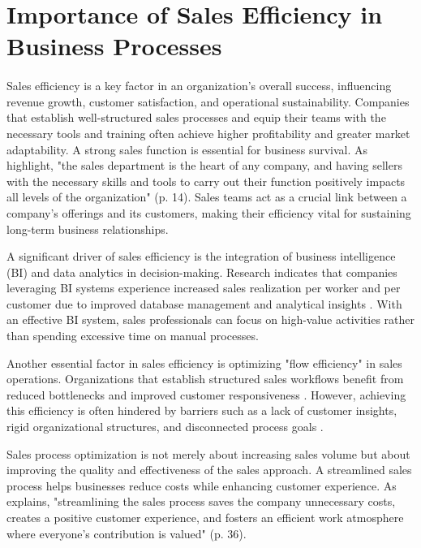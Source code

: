 \section{Importance of Sales Efficiency in Business Processes}

\paragraph{} Sales efficiency is a key factor in an organization's overall success, influencing revenue growth, customer satisfaction, and operational sustainability. Companies that establish well-structured sales processes and equip their teams with the necessary tools and training often achieve higher profitability and greater market adaptability. A strong sales function is essential for business survival. As \cite{deleon2023} highlight, "the sales department is the heart of any company, and having sellers with the necessary skills and tools to carry out their function positively impacts all levels of the organization" (p. 14). Sales teams act as a crucial link between a company's offerings and its customers, making their efficiency vital for sustaining long-term business relationships.

A significant driver of sales efficiency is the integration of business intelligence (BI) and data analytics in decision-making. Research indicates that companies leveraging BI systems experience increased sales realization per worker and per customer due to improved database management and analytical insights \cite{poljak2024}. With an effective BI system, sales professionals can focus on high-value activities rather than spending excessive time on manual processes.

Another essential factor in sales efficiency is optimizing "flow efficiency" in sales operations. Organizations that establish structured sales workflows benefit from reduced bottlenecks and improved customer responsiveness \cite{bergqvist2013}. However, achieving this efficiency is often hindered by barriers such as a lack of customer insights, rigid organizational structures, and disconnected process goals \cite{bergqvist2013}.

Sales process optimization is not merely about increasing sales volume but about improving the quality and effectiveness of the sales approach. A streamlined sales process helps businesses reduce costs while enhancing customer experience. As \cite{kohonen2022} explains, "streamlining the sales process saves the company unnecessary costs, creates a positive customer experience, and fosters an efficient work atmosphere where everyone's contribution is valued" (p. 36).

